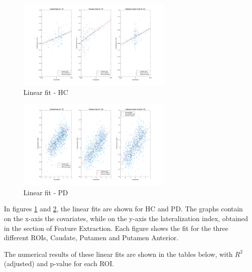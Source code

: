 \documentclass[]{article}
\begin{document}
\begin{figure}[h]
	\centering
	\includegraphics[width=3in]{../fit_covariates_hc}
	\caption{Linear fit - HC}
	\label{fig:lin_fit_hc}
\end{figure} 

\begin{figure}[h]
	\centering
	\includegraphics[width=3in]{../fit_covariates_pd}
	\caption{Linear fit - PD}
	\label{fig:lin_fit_pd}
\end{figure} 

\begin{multicols}{2}

In figures \ref{fig:lin_fit_hc} and \ref{fig:lin_fit_pd}, the linear fits are shown for HC and PD. The graphs contain on the x-axis the covariates, while on the y-axis the lateralization index, obtained in the section of Feature Extraction. Each figure shows the fit for the three different ROIs, Caudate, Putamen and Putamen Anterior. 

The numerical results of these linear fits are shown in the tables below, with $R^2$ (adjusted) and p-value for each ROI.

\end{multicols}
\end{document}
